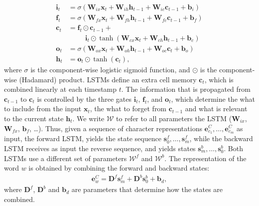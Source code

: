 \documentclass[11pt]{article}
\begin{document}
\begin{CJK*}{UTF8}{gbsn}
\begin{align*}
\mathbf{i}_t &= \sigma(\mathbf{W}_{ix}\mathbf{x}_t + \mathbf{W}_{ih}\mathbf{h}_{t-1} + \mathbf{W}_{ic}\mathbf{c}_{t-1} + \mathbf{b}_i) \\
\mathbf{f}_t &= \sigma(\mathbf{W}_{fx}\mathbf{x}_t + \mathbf{W}_{fh}\mathbf{h}_{t-1} + \mathbf{W}_{fc}\mathbf{c}_{t-1} + \mathbf{b}_f) \\
\mathbf{c}_t &= \mathbf{f}_t \odot \mathbf{c}_{t-1} + \\
& {}\ \ \qquad \mathbf{i}_t \odot \tanh(\mathbf{W}_{cx}\mathbf{x}_t +  \mathbf{W}_{ch}\mathbf{h}_{t-1} + \mathbf{b}_c)\\
\mathbf{o}_t &= \sigma(\mathbf{W}_{ox}\mathbf{x}_t + \mathbf{W}_{oh}\mathbf{h}_{t-1} + \mathbf{W}_{oc}\mathbf{c}_{t} + \mathbf{b}_o) \\
\mathbf{h}_t &= \mathbf{o}_t \odot \tanh(\mathbf{c}_t),
\end{align*}
where $\sigma$ is the component-wise logistic sigmoid function, and $\odot$ is the component-wise (Hadamard) product. LSTMs define an extra cell memory $\mathbf{c}_t$, which is combined linearly at each timestamp $t$. The information that is propagated from $\mathbf{c}_{t-1}$ to $\mathbf{c}_{t}$ is controlled by the three gates $\mathbf{i}_t$, $\mathbf{f}_t$,  and $\mathbf{o}_t$, which determine the what to include from the input $\mathbf{x}_t$, the what to forget from $\mathbf{c}_{t-1}$ and what is relevant to the current state $\mathbf{h}_t$. We write $\mathcal{W}$ to refer to all parameters the LSTM ($\mathbf{W}_{ix}$, $\mathbf{W}_{fx}$, $\mathbf{b}_f$, \ldots). Thus, given a sequence of character representations $\mathbf{e}^C_{c_1},\ldots,\mathbf{e}^C_{c_m}$ as input, the forward LSTM, yields the state sequence $\mathbf{s}^f_0,\ldots,\mathbf{s}^f_m$, while the backward LSTM receives as input the reverse sequence, and yields states $\mathbf{s}^b_m,\ldots,\mathbf{s}^b_0$. Both LSTMs use a different set of parameters $\mathcal{W}^f$ and $\mathcal{W}^b$. The representation of the word $w$ is obtained by combining the forward and backward states:
\begin{align*}
\mathbf{e}^C_w = \mathbf{D}^f \mathbf{s}^f_m + \mathbf{D}^b \mathbf{s}^b_0 + \mathbf{b}_{d},
\end{align*}
where $\mathbf{D}^f$, $\mathbf{D}^b$ and $\mathbf{b}_{d}$ are parameters that determine how the states are combined. 


\end{CJK*}
\end{document}

